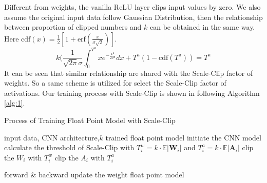 \documentclass[letterpaper]{article} %
\begin{document}
Different from weights, the vanilla ReLU layer clips input values by zero. We also assume the original input data follow Gaussian Distribution, then the relationship between proportion of clipped numbers and $k$ can be obtained in the same way. Here $\text{cdf}(x)=\frac{1}{2}\left[1+\text{erf}(\frac{x}{\sigma \sqrt{2}})\right]$.
\begin{equation}
k(\frac{1}{\sqrt{2\pi}\sigma}\int_{0}^{
T^a}xe^{-\frac{x^2}{2\sigma^2}}dx + T^a(1-\text{cdf}(T^a))=T^a
\label{eq:activation}
\end{equation}
It can be seen that similar relationship are shared with the Scale-Clip factor of weights. So a same scheme is utilized for select the Scale-Clip factor of activations.
Our training process with Scale-Clip is shown in following Algorithm \ref{alg:1}.
\begin{algorithm}[!ht]
	\caption{Process of Training Float Point Model with Scale-Clip}\label{alg:1}
	\begin{algorithmic}[1]
		\Require input data, CNN architecture,$k$
		\Ensure trained float point model
		\State initiate the CNN model
        \State calculate the threshold of Scale-Clip with $T^w_{i}=k \cdot \mathbb{E}{|\mathbf{W}_{i}|}$ and $T^a_{i}=k \cdot \mathbb{E}{|\mathbf{A}_{i}|}$
		\State clip the $W_i$ with $T^w_i$
        \State clip the $A_i$ with $T^a_i$
		
        
        \EndFor
		\State forward \& backward 
		\State update the weight
		\EndFor	
		\EndFor
		\State \Return float point model
	\end{algorithmic}
\end{algorithm}

\end{document}
